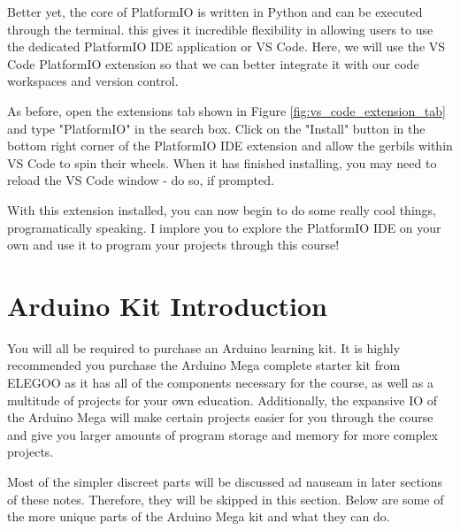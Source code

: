     Better yet, the core of PlatformIO is written in Python and can be executed through the terminal.
    this gives it incredible flexibility in allowing users to use the dedicated PlatformIO IDE application or VS Code.
    Here, we will use the VS Code PlatformIO extension so that we can better integrate it with our code workspaces and version control.

    As before, open the extensions tab shown in Figure \ref{fig:vs_code_extension_tab} and type "PlatformIO" in the search box.
    Click on the "Install" button in the bottom right corner of the PlatformIO IDE extension and allow the gerbils within VS Code to spin their wheels.
    When it has finished installing, you may need to reload the VS Code window - do so, if prompted.

    With this extension installed, you can now begin to do some really cool things, programatically speaking.
    I implore you to explore the PlatformIO IDE on your own and use it to program your projects through this course!

\pagebreak

\section{Arduino Kit Introduction}

You will all be required to purchase an Arduino learning kit. 
It is highly recommended you purchase the Arduino Mega complete starter kit from ELEGOO as it has all of the components necessary for the course, as well as a multitude of projects for your own education.
Additionally, the expansive IO of the Arduino Mega will make certain projects easier for you through the course and give you larger amounts of program storage and memory for more complex projects.

Most of the simpler discreet parts will be discussed ad nauseam in later sections of these notes.
Therefore, they will be skipped in this section.
Below are some of the more unique parts of the Arduino Mega kit and what they can do.
    
